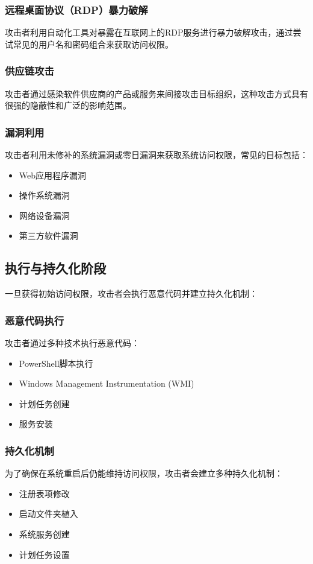 \documentclass[12pt,a4paper]{article}
\begin{document}
\subsubsection{远程桌面协议（RDP）暴力破解}
攻击者利用自动化工具对暴露在互联网上的RDP服务进行暴力破解攻击，通过尝试常见的用户名和密码组合来获取访问权限。

\subsubsection{供应链攻击}
攻击者通过感染软件供应商的产品或服务来间接攻击目标组织，这种攻击方式具有很强的隐蔽性和广泛的影响范围。

\subsubsection{漏洞利用}
攻击者利用未修补的系统漏洞或零日漏洞来获取系统访问权限，常见的目标包括：
\begin{itemize}
    \item Web应用程序漏洞
    \item 操作系统漏洞
    \item 网络设备漏洞
    \item 第三方软件漏洞
\end{itemize}

\subsection{执行与持久化阶段}

一旦获得初始访问权限，攻击者会执行恶意代码并建立持久化机制：

\subsubsection{恶意代码执行}
攻击者通过多种技术执行恶意代码：
\begin{itemize}
    \item PowerShell脚本执行
    \item Windows Management Instrumentation (WMI)
    \item 计划任务创建
    \item 服务安装
\end{itemize}

\subsubsection{持久化机制}
为了确保在系统重启后仍能维持访问权限，攻击者会建立多种持久化机制：
\begin{itemize}
    \item 注册表项修改
    \item 启动文件夹植入
    \item 系统服务创建
    \item 计划任务设置
\end{itemize}
\end{document}
